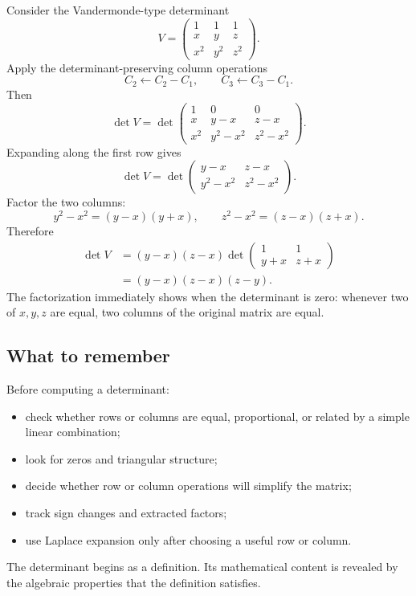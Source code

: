 Consider the Vandermonde-type determinant
\[
V=\begin{pmatrix}
1&1&1\\
x&y&z\\
x^2&y^2&z^2
\end{pmatrix}.
\]
Apply the determinant-preserving column operations
\[
C_2\leftarrow C_2-C_1,
\qquad
C_3\leftarrow C_3-C_1.
\]
Then
\[
\det V
=
\det\begin{pmatrix}
1&0&0\\
x&y-x&z-x\\
x^2&y^2-x^2&z^2-x^2
\end{pmatrix}.
\]
Expanding along the first row gives
\[
\det V
=
\det\begin{pmatrix}
y-x&z-x\\
y^2-x^2&z^2-x^2
\end{pmatrix}.
\]
Factor the two columns:
\[
y^2-x^2=(y-x)(y+x),
\qquad
z^2-x^2=(z-x)(z+x).
\]
Therefore
\[
\begin{aligned}
\det V
&=(y-x)(z-x)
\det\begin{pmatrix}1&1\\y+x&z+x\end{pmatrix}\\
&=(y-x)(z-x)(z-y).
\end{aligned}
\]
The factorization immediately shows when the determinant is zero: whenever two of \(x,y,z\) are equal, two columns of the original matrix are equal.

\subsection*{What to remember}

\begin{summarybox}
Before computing a determinant:
\begin{itemize}
\item check whether rows or columns are equal, proportional, or related by a simple linear combination;
\item look for zeros and triangular structure;
\item decide whether row or column operations will simplify the matrix;
\item track sign changes and extracted factors;
\item use Laplace expansion only after choosing a useful row or column.
\end{itemize}

The determinant begins as a definition. Its mathematical content is revealed by the algebraic properties that the definition satisfies.
\end{summarybox}
